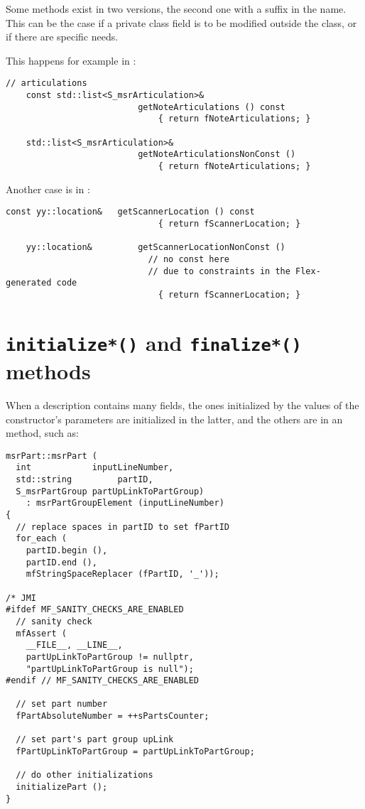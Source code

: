 Some methods exist in two versions, the second one with a  suffix in the name. This can be the case if a private class   field is to be modified outside the class, or if there are specific needs.

This happens for example in :
\begin{lstlisting}[language=CPlusPlus]
    // articulations
    const std::list<S_msrArticulation>&
                          getNoteArticulations () const
                              { return fNoteArticulations; }

    std::list<S_msrArticulation>&
                          getNoteArticulationsNonConst ()
                              { return fNoteArticulations; }
\end{lstlisting}

Another case is in :
\begin{lstlisting}[language=CPlusPlus]
    const yy::location&   getScannerLocation () const
                              { return fScannerLocation; }

    yy::location&         getScannerLocationNonConst ()
                            // no const here
                            // due to constraints in the Flex-generated code
                              { return fScannerLocation; }
\end{lstlisting}


\section{{\tt initialize*()} and {\tt finalize*()} methods}

When a description contains many fields, the ones initialized by the values of the constructor's parameters are initialized in the latter, and the others are in an  method, such as:
\begin{lstlisting}[language=CPlusPlus]
msrPart::msrPart (
  int            inputLineNumber,
  std::string         partID,
  S_msrPartGroup partUpLinkToPartGroup)
    : msrPartGroupElement (inputLineNumber)
{
  // replace spaces in partID to set fPartID
  for_each (
    partID.begin (),
    partID.end (),
    mfStringSpaceReplacer (fPartID, '_'));

/* JMI
#ifdef MF_SANITY_CHECKS_ARE_ENABLED
  // sanity check
  mfAssert (
    __FILE__, __LINE__,
    partUpLinkToPartGroup != nullptr,
    "partUpLinkToPartGroup is null");
#endif // MF_SANITY_CHECKS_ARE_ENABLED

  // set part number
  fPartAbsoluteNumber = ++sPartsCounter;

  // set part's part group upLink
  fPartUpLinkToPartGroup = partUpLinkToPartGroup;

  // do other initializations
  initializePart ();
}
\end{lstlisting}

